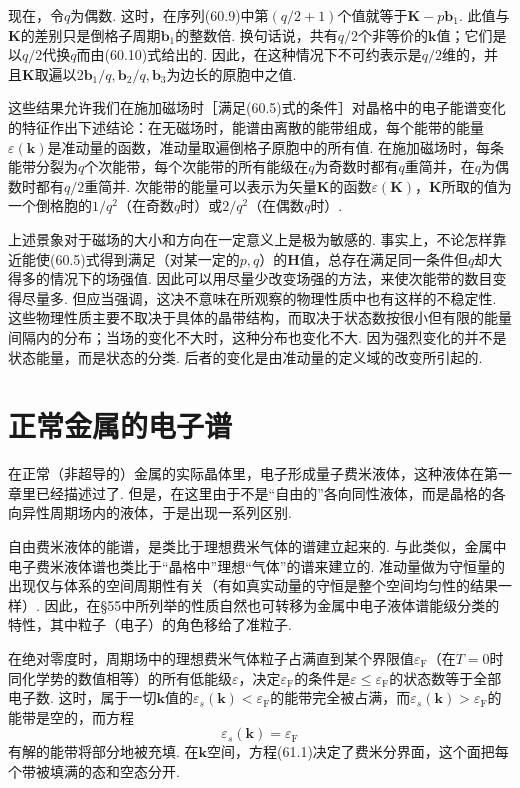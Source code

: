 现在，令$q$为偶数. 这时，在序列(60.9)中第$(q/2+1)$个值就等于$\bm K-p\bm b_1$. 此值与$\bm K$的差别只是倒格子周期$\bm b_1$的整数倍. 换句话说，共有$q/2$个非等价的$\bm k$值；它们是以$q/2$代换$q$而由(60.10)式给出的. 因此，在这种情况下不可约表示是$q/2$维的，并且$\bm K$取遍以$2\bm b_1/q,\bm b_2/q,\bm b_3$为边长的原胞中之值.

这些结果允许我们在施加磁场时［满足(60.5)式的条件］对晶格中的电子能谱变化的特征作出下述结论：在无磁场时，能谱由离散的能带组成，每个能带的能量$\varepsilon(\bm k)$是准动量的函数，准动量取遍倒格子原胞中的所有值. 在施加磁场时，每条能带分裂为$q$个次能带，每个次能带的所有能级在$q$为奇数时都有$q$重简并，在$q$为偶数时都有$q/2$重简并. 次能带的能量可以表示为矢量$\bm K$的函数$\varepsilon(\bm K)$，$\bm K$所取的值为一个倒格胞的$1/q^2$（在奇数$q$时）或$2/q^2$（在偶数$q$时）.

上述景象对于磁场的大小和方向在一定意义上是极为敏感的. 事实上，不论怎样靠近能使(60.5)式得到满足（对某一定的$p,q$）的$\bm H$值，总存在满足同一条件但$q$却大得多的情况下的场强值. 因此可以用尽量少改变场强的方法，来使次能带的数目变得尽量多. 但应当强调，这决不意味在所观察的物理性质中也有这样的不稳定性. 这些物理性质主要不取决于具体的晶带结构，而取决于状态数按很小但有限的能量间隔内的分布；当场的变化不大时，这种分布也变化不大. 因为强烈变化的并不是状态能量，而是状态的分类. 后者的变化是由准动量的定义域的改变所引起的.

\section{正常金属的电子谱}

在正常（非超导的）金属的实际晶体里，电子形成量子费米液体，这种液体在第一章里已经描述过了. 但是，在这里由于不是“自由的”各向同性液体，而是晶格的各向异性周期场内的液体，于是出现一系列区别.

自由费米液体的能谱，是类比于理想费米气体的谱建立起来的. 与此类似，金属中电子费米液体谱也类比于“晶格中”理想“气体”的谱来建立的. 准动量做为守恒量的出现仅与体系的空间周期性有关（有如真实动量的守恒是整个空间均匀性的结果一样）. 因此，在§55中所列举的性质自然也可转移为金属中电子液体谱能级分类的特性，其中粒子（电子）的角色移给了准粒子.

在绝对零度时，周期场中的理想费米气体粒子占满直到某个界限值$\varepsilon_{\mathrm F}$（在$T=0$时同化学势的数值相等）的所有低能级$\varepsilon$，决定$\varepsilon_{\mathrm F}$的条件是$\varepsilon\leqslant\varepsilon_{\mathrm F}$的状态数等于全部电子数. 这时，属于一切$\bm k$值的$\varepsilon_s(\bm k)<\varepsilon_{\mathrm F}$的能带完全被占满，而$\varepsilon_s(\bm k)>\varepsilon_{\mathrm F}$的能带是空的，而方程
\begin{equation}
\varepsilon_s(\bm k)=\varepsilon_{\mathrm F}
\label{61.1}
\end{equation}
有解的能带将部分地被充填. 在$\bm k$空间，方程(61.1)决定了费米分界面，这个面把每个带被填满的态和空态分开.

